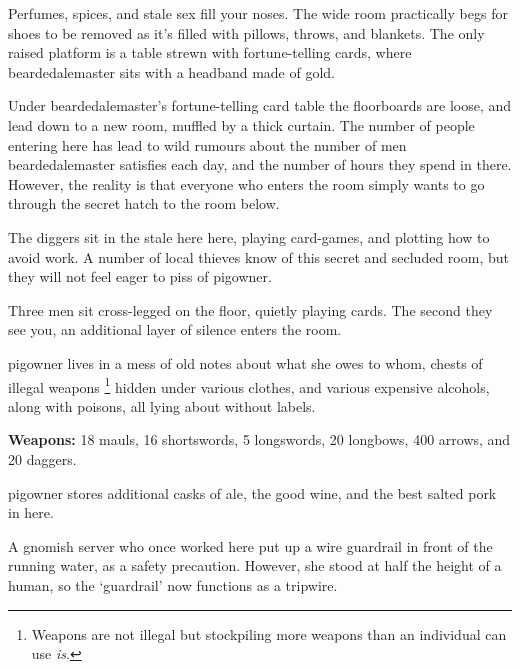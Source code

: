 \begin{multicols}{2}
\begin{boxtext}
  Perfumes, spices, and stale sex fill your noses.
  The wide room practically begs for shoes to be removed as it's filled with pillows, throws, and blankets.
  The only raised platform is a table strewn with fortune-telling cards, where \gls{beardedalemaster} sits with a headband made of gold.
\end{boxtext}

Under \gls{beardedalemaster}'s fortune-telling card table the floorboards are loose, and lead down to a new room, muffled by a thick curtain.
The number of people entering here has lead to wild rumours about the number of men \gls{beardedalemaster} satisfies each day, and the number of hours they spend in there.
However, the reality is that everyone who enters the room simply wants to go through the secret hatch to the room below.

\beardedalemaster


The \glspl{digger} sit in the stale here here, playing card-games, and plotting how to avoid work.
A number of local thieves know of this secret and secluded room, but they will not feel eager to piss of \gls{pigowner}.

\begin{boxtext}
  Three men sit cross-legged on the floor, quietly playing cards.
  The second they see you, an additional layer of silence enters the room.
\end{boxtext}



\Gls{pigowner} lives in a mess of old notes about what she owes to whom, chests of illegal weapons%
\footnote{Weapons are not illegal but stockpiling more weapons than an individual can use \emph{is}.}
hidden under various clothes, and various expensive alcohols, along with poisons, all lying about without labels.

\textbf{Weapons:} 18 mauls, 16 shortswords, 5 longswords, 20 longbows, 400 arrows, and 20 daggers.


\Gls{pigowner} stores additional casks of ale, the good wine, and the best salted pork in here.


\begin{exampletext}
  A gnomish \gls{server} who once worked here put up a wire guardrail in front of the running water, as a safety precaution.
  However, she stood at half the height of a human, so the `guardrail' now functions as a tripwire.
\end{exampletext}


\end{multicols}
